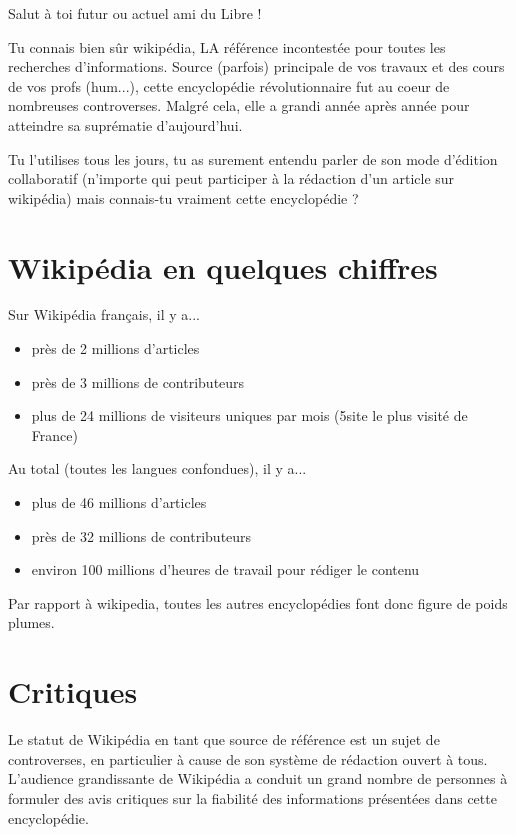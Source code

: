 \documentclass[12pt]{../fiche}
\begin{document}
Salut à toi futur ou actuel ami du Libre ! 
\vspace{0.8em}

Tu connais bien sûr wikipédia, LA référence incontestée pour toutes les recherches d'informations.
Source (parfois) principale de vos travaux et des cours de vos profs (hum...),
cette encyclopédie révolutionnaire fut au coeur de nombreuses controverses.
Malgré cela, elle a grandi année après année pour atteindre sa suprématie d'aujourd'hui.

Tu l'utilises tous les jours, tu as surement entendu parler de son mode
d'édition collaboratif (n'importe qui peut participer à la rédaction d'un
article sur wikipédia) mais connais-tu vraiment cette encyclopédie ?

\vspace{-0.3cm}
\section*{Wikipédia en quelques chiffres}

Sur Wikipédia français, il y a...
\begin{itemize}
    \item près de 2 millions d'articles
    \item près de 3 millions de contributeurs
    \item plus de 24 millions de visiteurs uniques par mois (5\ieme site le plus visité de France)
\end{itemize}
\medskip

Au total (toutes les langues confondues), il y a...
\begin{itemize}
    \item plus de 46 millions d'articles
    \item près de 32 millions de contributeurs
    \item environ 100 millions d'heures de travail pour rédiger le contenu
\end{itemize}
\medskip

Par rapport à wikipedia, toutes les autres encyclopédies font donc figure de poids plumes.

\vspace{-0.3cm}
\section*{Critiques}

Le statut de Wikipédia en tant que source de référence est un sujet de
controverses, en particulier à cause de son système de rédaction ouvert à tous.
L'audience grandissante de Wikipédia a conduit un grand nombre de personnes à
formuler des avis critiques sur la fiabilité des informations présentées dans
cette encyclopédie.
\end{document}

